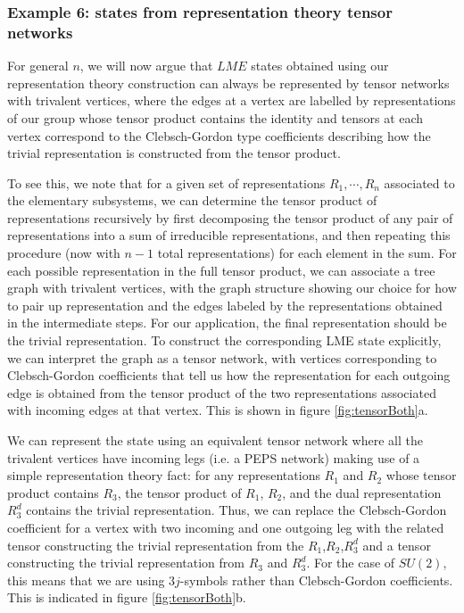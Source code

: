 \documentclass[12pt]{article}
\theoremstyle{definition}
\begin{document}
\subsubsection*{Example 6: states from representation theory tensor networks}

For general $n$, we will now argue that $LME$ states obtained using our representation theory construction can always be represented by tensor networks with trivalent vertices, where the edges at a vertex are labelled by representations of our group whose tensor product contains the identity and tensors at each vertex correspond to the Clebsch-Gordon type coefficients describing how the trivial representation is constructed from the tensor product.

To see this, we note that for a given set of representations $R_1, \cdots, R_n$ associated to the elementary subsystems, we can determine the tensor product of representations recursively by first decomposing the tensor product of any pair of representations into a sum of irreducible representations, and then repeating this procedure (now with $n-1$ total representations) for each element in the sum. For each possible representation in the full tensor product, we can associate a tree graph with trivalent vertices, with the graph structure showing our choice for how to pair up representation and the edges labeled by the representations obtained in the intermediate steps. For our application, the final representation should be the trivial representation. To construct the corresponding LME state explicitly, we can interpret the graph as a tensor network, with vertices corresponding to Clebsch-Gordon coefficients that tell us how the representation for each outgoing edge is obtained from the tensor product of the two representations associated with incoming edges at that vertex. This is shown in figure \ref{fig:tensorBoth}a.

We can represent the state using an equivalent tensor network where all the trivalent vertices have incoming legs (i.e. a PEPS network) making use of a simple representation theory fact: for any representations $R_1$ and $R_2$ whose tensor product contains $R_3$, the tensor product of $R_1$, $R_2$, and the dual representation $R_3^d$ contains the trivial representation. Thus, we can replace the Clebsch-Gordon coefficient for a vertex with two incoming and one outgoing leg with the related tensor constructing the trivial representation from the $R_1$,$R_2$,$R_3^d$ and a tensor constructing the trivial representation from $R_3$ and $R_3^d$. For the case of $SU(2)$, this means that we are using $3j$-symbols rather than Clebsch-Gordon coefficients. This is indicated in figure \ref{fig:tensorBoth}b.
\end{document}
